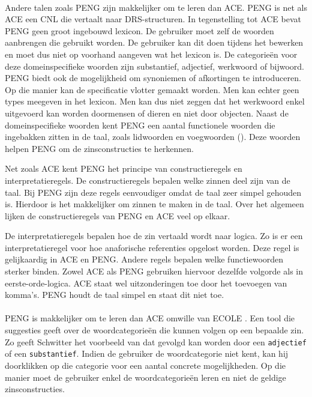 \paragraph{} Andere talen zoals PENG \cite{Schwitter2002} zijn makkelijker om te leren dan ACE. PENG is net als ACE een CNL die vertaalt naar DRS-structuren. In tegenstelling tot ACE bevat PENG geen groot ingebouwd lexicon. De gebruiker moet zelf de woorden aanbrengen die gebruikt worden. De gebruiker kan dit doen tijdens het bewerken en moet dus niet op voorhand aangeven wat het lexicon is. De categorie\"en voor deze domeinspecifieke woorden zijn substantief, adjectief, werkwoord of bijwoord. PENG biedt ook de mogelijkheid om synoniemen of afkortingen te introduceren. Op die manier kan de specificatie vlotter gemaakt worden. Men kan echter geen types meegeven in het lexicon. Men kan dus niet zeggen dat het werkwoord  enkel uitgevoerd kan worden doormensen of dieren en niet door objecten. Naast de domeinspecifieke woorden kent PENG een aantal functionele woorden die ingebakken zitten in de taal, zoals lidwoorden en voegwoorden (). Deze woorden helpen PENG om de zinsconstructies te herkennen.

Net zoals ACE kent PENG het principe van constructieregels en interpretatieregels. De constructieregels bepalen welke zinnen deel zijn van de taal. Bij PENG zijn deze regels eenvoudiger omdat de taal zeer simpel gehouden is. Hierdoor is het makkelijker om zinnen te maken in de taal. Over het algemeen lijken de constructieregels van PENG en ACE veel op elkaar.

De interpretatieregels bepalen hoe de zin vertaald wordt naar logica. Zo is er een interpretatieregel voor hoe anaforische referenties opgelost worden. Deze regel is gelijkaardig in ACE en PENG. Andere regels bepalen welke functiewoorden sterker binden. Zowel ACE als PENG gebruiken hiervoor dezelfde volgorde als in eerste-orde-logica. ACE staat wel uitzonderingen toe door het toevoegen van komma's. PENG houdt de taal simpel en staat dit niet toe.

\paragraph{} PENG is makkelijker om te leren dan ACE omwille van ECOLE \cite{Schwitter2003}. Een tool die suggesties geeft over de woordcategorie\"en die kunnen volgen op een bepaalde zin. Zo geeft Schwitter \cite{Schwitter2003} het voorbeeld van  dat gevolgd kan worden door een \texttt{adjectief} of een \texttt{substantief}. Indien de gebruiker de woordcategorie niet kent, kan hij doorklikken op die categorie voor een aantal concrete mogelijkheden. Op die manier moet de gebruiker enkel de woordcategorie\"en leren en niet de geldige zinsconstructies.

